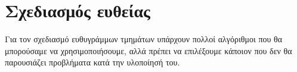 \section{Σχεδιασμός ευθείας}

Για τον σχεδιασμό ευθυγράμμων τμημάτων υπάρχουν πολλοί αλγόριθμοι που θα μπορούσαμε να χρησιμοποιήσουμε, αλλά πρέπει να επιλέξουμε κάποιον που δεν θα παρουσιάζει προβλήματα κατά την υλοποίησή του.





	




	
\newpage	
	



